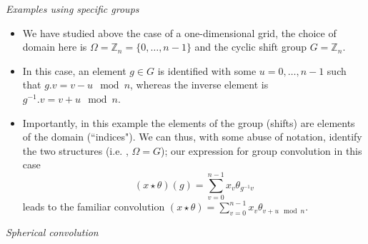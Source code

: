 \documentclass[12pt]{article}
\numberwithin{equation}{section}
\theoremstyle{definition}
\newcommand{		\n		}	{	\noindent					} %
\newcommand{		\1		}	{	\bm{1}					}%
\begin{document}
\n\hrulefill 
\emph{ Examples using specific groups }
\hrulefill

\begin{itemize}
\item We have studied above the case of a one-dimensional grid, the choice of domain here is $\Omega = \mathbb{Z}_n = \{ 0 , \dots, n-1\}$ and the cyclic shift group $G = \mathbb{Z}_n$. 
\item In this case, an element $g \in G$ is identified with some $u = 0, \dots, n-1$ such that $g.v = v -  u \mod n$, whereas the inverse element is $g^{-1} . v = v + u \mod n$. 
\item Importantly, in this example the elements of the group (shifts) are elements of the domain (``indices"). We can thus, with some abuse of notation, identify the two structures (i.e. , $\Omega = G$); our expression for group convolution in this case
$$
( x \star \theta ) (g) = \sum_{ v = 0}^{n-1} x_v \theta_{g^{-1} v } 
$$
leads to the familiar convolution $( x \star \theta) = \sum_{ v = 0}^{n-1} x_v \theta_{v + u \mod n}$. 

\end{itemize}


\n\hrulefill 
\emph{ Spherical convolution }
\hrulefill
\end{document}
